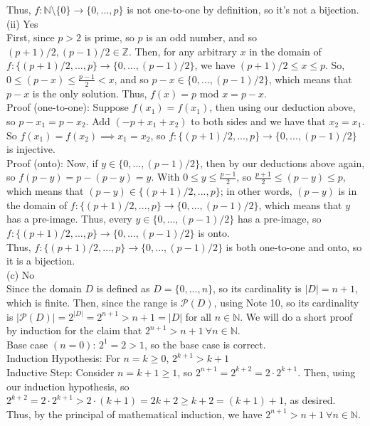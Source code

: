 \documentclass{article}
\begin{document}
\indent Thus, $f:\mathbb{N}\setminus\{0\}\rightarrow\{0,...,p\}$ is not one-to-one by definition, so it's not a bijection. \\[.3cm]
(ii) {\color{red} Yes} \\[.2cm]
\indent First, since $p>2$ is prime, so $p$ is an odd number, and so $(p+1)/2,(p-1)/2\in\mathbb{Z}$.
Then, for any arbitrary $x$ in the domain of $f:\{(p+1)/2,...,p\}\rightarrow\{0,...,(p-1)/2\}$, we have $(p+1)/2\leq x\leq p$.
So, $0\leq(p-x)\leq\frac{p-1}{2} < x$, and so $p-x\in\{0,...,(p-1)/2\}$, which means that $p-x$ is the only solution.
Thus, $f(x) = p$ mod $x = p-x$. \\[.1cm]
\indent Proof (one-to-one): Suppose $f(x_1) = f(x_1)$, then using our deduction above, so $p - x_1 = p - x_2$.
Add $(-p + x_1 + x_2)$ to both sides and we have that $x_2 = x_1$.
So $f(x_1) = f(x_2)\implies x_1 = x_2$, so $f:\{(p+1)/2,...,p\}\rightarrow\{0,...,(p-1)/2\}$ is injective. \\[.1cm]
\indent Proof (onto): Now, if $y\in\{0,...,(p-1)/2\}$, then by our deductions above again, so $f(p-y) = p - (p-y) = y$.
With $0\leq y\leq\frac{p-1}{2}$, so $\frac{p+1}{2}\leq(p-y)\leq p$, which means that $(p-y)\in\{(p+1)/2,...,p\}$; in other words, $(p-y)$ is in the domain of $f:\{(p+1)/2,...,p\}\rightarrow\{0,...,(p-1)/2\}$, which means that $y$ has a pre-image.
Thus, every $y\in\{0,...,(p-1)/2\}$ has a pre-image, so $f:\{(p+1)/2,...,p\}\rightarrow\{0,...,(p-1)/2\}$ is onto. \\[.1cm]
\indent Thus, $f:\{(p+1)/2,...,p\}\rightarrow\{0,...,(p-1)/2\}$ is both one-to-one and onto, so it is a bijection. \pagebreak\\
(c) {\color{red} No} \\[.3cm]
\indent Since the domain $D$ is defined as $D = \{0,...,n\}$, so its cardinality is $|D| = n+1$, which is finite. Then, since the range is $\mathscr{P}(D)$, using Note 10, so its cardinality is $|\mathscr{P}(D)| = 2^{|D|} = 2^{n+1} > n+1 = |D|$ for all $n\in\mathbb{N}$. We will do a short proof by induction for the claim that $2^{n+1} > n+1\ \forall n\in\mathbb{N}.$ \\

Base case $(n = 0)$: $2^1 = 2 > 1$, so the base case is correct. \\
\indent Induction Hypothesis: For $n = k\geq0$, $2^{k+1} > k+1$ \\
\indent Inductive Step: Consider $n = k+1\geq1$, so $2^{n+1} = 2^{k+2} = 2\cdot2^{k+1}$. Then, using our induction hypothesis, so $2^{k+2} = 2\cdot2^{k+1} > 2\cdot(k+1) = 2k + 2\geq k+2 = (k+1)+1$, as desired. \\
\indent Thus, by the principal of mathematical induction, we have $2^{n+1} > n+1\ \forall n\in\mathbb{N}.$ \\
\end{document}
